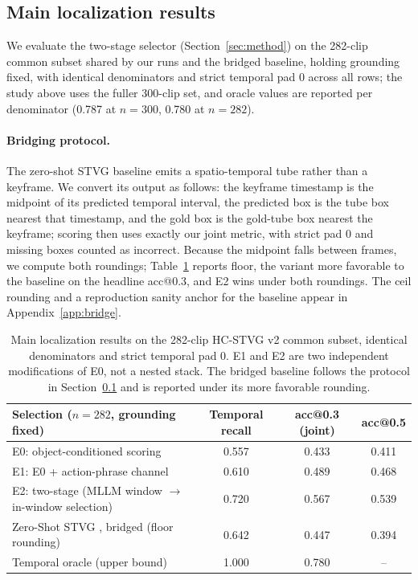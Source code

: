 \documentclass[10pt]{article}
\begin{document}
\subsection{Main localization results}\label{sec:exp-select}

We evaluate the two-stage selector (Section~\ref{sec:method}) on the 282-clip common subset shared by our runs and the bridged baseline, holding grounding fixed, with identical denominators and strict temporal pad 0 across all rows; the study above uses the fuller 300-clip set, and oracle values are reported per denominator (0.787 at $n=300$, 0.780 at $n=282$).

\paragraph{Bridging protocol.}
The zero-shot STVG baseline \citep{zeroshotstvg2509} emits a spatio-temporal tube rather than a keyframe. We convert its output as follows: the keyframe timestamp is the midpoint of its predicted temporal interval, the predicted box is the tube box nearest that timestamp, and the gold box is the gold-tube box nearest the keyframe; scoring then uses exactly our joint metric, with strict pad 0 and missing boxes counted as incorrect. Because the midpoint falls between frames, we compute both roundings; Table~\ref{tab:selector} reports floor, the variant more favorable to the baseline on the headline acc@0.3, and E2 wins under both roundings. The ceil rounding and a reproduction sanity anchor for the baseline appear in Appendix~\ref{app:bridge}.

\begin{table}[t]
\centering
\small
\begin{tabular}{lccc}
\toprule
Selection ($n=282$, grounding fixed) & Temporal recall & acc@0.3 (joint) & acc@0.5 \\
\midrule
E0: object-conditioned scoring & 0.557 & 0.433 & 0.411 \\
E1: E0 + action-phrase channel & 0.610 & 0.489 & 0.468 \\
E2: two-stage (MLLM window $\rightarrow$ in-window selection) & 0.720 & 0.567 & 0.539 \\
\midrule
Zero-Shot STVG \citep{zeroshotstvg2509}, bridged (floor rounding) & 0.642 & 0.447 & 0.394 \\
Temporal oracle (upper bound) & 1.000 & 0.780 & -- \\
\bottomrule
\end{tabular}
\caption{Main localization results on the 282-clip HC-STVG v2 common subset, identical denominators and strict temporal pad 0. E1 and E2 are two independent modifications of E0, not a nested stack. The bridged baseline follows the protocol in Section~\ref{sec:exp-select} and is reported under its more favorable rounding.}
\label{tab:selector}
\end{table}
\end{document}
